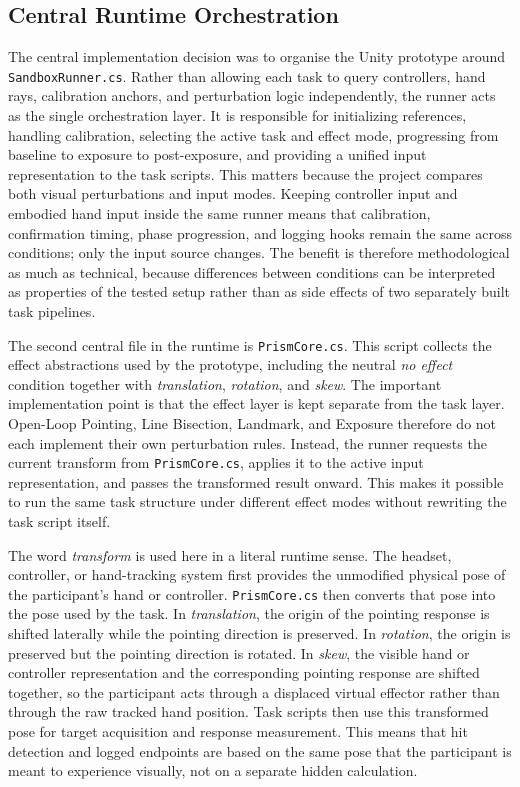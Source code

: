 \subsection{Central Runtime Orchestration}
\label{subsec:implementation-runtime}

The central implementation decision was to organise the Unity prototype around \texttt{SandboxRunner.cs}. Rather than allowing each task to query controllers, hand rays, calibration anchors, and perturbation logic independently, the runner acts as the single orchestration layer. It is responsible for initializing references, handling calibration, selecting the active task and effect mode, progressing from baseline to exposure to post-exposure, and providing a unified input representation to the task scripts. This matters because the project compares both visual perturbations and input modes. Keeping controller input and embodied hand input inside the same runner means that calibration, confirmation timing, phase progression, and logging hooks remain the same across conditions; only the input source changes. The benefit is therefore methodological as much as technical, because differences between conditions can be interpreted as properties of the tested setup rather than as side effects of two separately built task pipelines.

The second central file in the runtime is \texttt{PrismCore.cs}. This script collects the effect abstractions used by the prototype, including the neutral \emph{no effect} condition together with \emph{translation}, \emph{rotation}, and \emph{skew}. The important implementation point is that the effect layer is kept separate from the task layer. Open-Loop Pointing, Line Bisection, Landmark, and Exposure therefore do not each implement their own perturbation rules. Instead, the runner requests the current transform from \texttt{PrismCore.cs}, applies it to the active input representation, and passes the transformed result onward. This makes it possible to run the same task structure under different effect modes without rewriting the task script itself.

The word \emph{transform} is used here in a literal runtime sense. The headset, controller, or hand-tracking system first provides the unmodified physical pose of the participant's hand or controller. \texttt{PrismCore.cs} then converts that pose into the pose used by the task. In \emph{translation}, the origin of the pointing response is shifted laterally while the pointing direction is preserved. In \emph{rotation}, the origin is preserved but the pointing direction is rotated. In \emph{skew}, the visible hand or controller representation and the corresponding pointing response are shifted together, so the participant acts through a displaced virtual effector rather than through the raw tracked hand position. Task scripts then use this transformed pose for target acquisition and response measurement. This means that hit detection and logged endpoints are based on the same pose that the participant is meant to experience visually, not on a separate hidden calculation.

